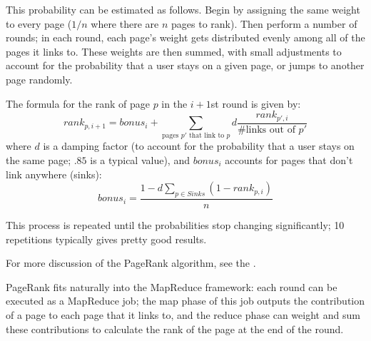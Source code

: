 \documentclass{pset}
\begin{document}
This probability can be estimated as follows.  Begin by assigning the same
weight to every page ($1/n$ where there are $n$ pages to rank).  Then perform a
number of rounds; in each round, each page's weight gets distributed evenly
among all of the pages it links to.  These weights are then summed, with small
adjustments to account for the probability that a user stays on a given page,
or jumps to another page randomly.

The formula for the rank of page $p$ in the $i+1$st round is given by:
\begin{displaymath}
rank_{p,i+1} = bonus_i + \sum_{\textrm{pages $p'$ that link to $p$}} d \frac{rank_{p',i}}{\textrm{\# links out of }p'}
\end{displaymath}
where $d$ is a damping factor (to account for the probability that a user stays
on the same page; $.85$ is a typical value), and $bonus_i$
accounts for pages that don't link anywhere (sinks):
\begin{displaymath}
bonus_i = \frac{1 - d\sum_{p \in Sinks}(1 - rank_{p,i})}{n}
\end{displaymath}

This process is repeated until the probabilities stop changing significantly;
10 repetitions typically gives pretty good results.

For more discussion of the PageRank algorithm, see the
.

PageRank fits naturally into the MapReduce framework: each round can be executed
as a MapReduce job; the map phase of this job outputs the contribution of a page
to each page that it links to, and the reduce phase can weight and sum these
contributions to calculate the rank of the page at the end of the round.
\end{document}

